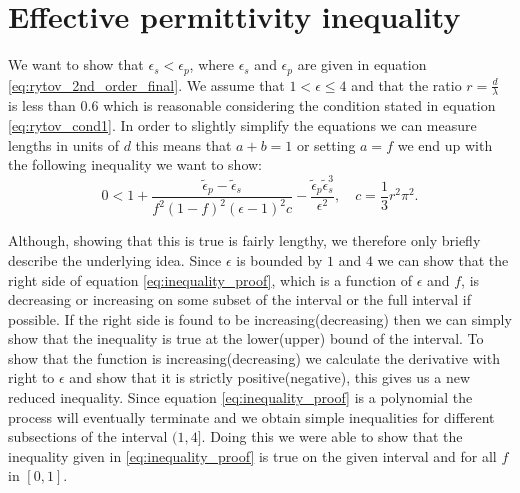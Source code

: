 \section{Effective permittivity inequality}
\label{sec:bf_proof}
We want to show that $\epsilon_{s}<\epsilon_{p}$, where $\epsilon_{s}$ and $\epsilon_{p}$ are given in equation \ref{eq:rytov_2nd_order_final}. We assume that $1<\epsilon\leq4$ and that the ratio $r=\frac{d}{\lambda}$ is less than $0.6$ which is reasonable considering the condition stated in equation \ref{eq:rytov_cond1}. In order to slightly simplify the equations we can measure lengths in units of $d$ this means that $a+b=1$ or setting $a=f$ we end up with the following inequality we want to show:
\begin{equation}
    \label{eq:inequality_proof}
    0<1+\frac{\tilde{\epsilon}_{p}-\tilde{\epsilon}_{s}}{f^2(1-f)^2(\epsilon-1)^2c}-\frac{\tilde{\epsilon}_{p}\tilde{\epsilon}_{s}^3}{\epsilon^2},\quad c=\frac{1}{3}r^2\pi^2.
\end{equation}

Although, showing that this is true is fairly lengthy, we therefore only briefly describe the underlying idea. Since $\epsilon$ is bounded by $1$ and $4$ we can show that the right side of equation \ref{eq:inequality_proof}, which is a function of $\epsilon$ and $f$, is decreasing or increasing on some subset of the interval or the full interval if possible. If the right side is found to be increasing(decreasing) then we can simply show that the inequality is true at the lower(upper) bound of the interval. To show that the function is increasing(decreasing) we calculate the derivative with right to $\epsilon$ and show that it is strictly positive(negative), this gives us a new reduced inequality. Since equation \ref{eq:inequality_proof} is a polynomial the process will eventually terminate and we obtain simple inequalities for different subsections of the interval $(1,4]$. Doing this we were able to show that the inequality given in \ref{eq:inequality_proof} is true on the given interval and for all $f$ in $[0,1]$.

